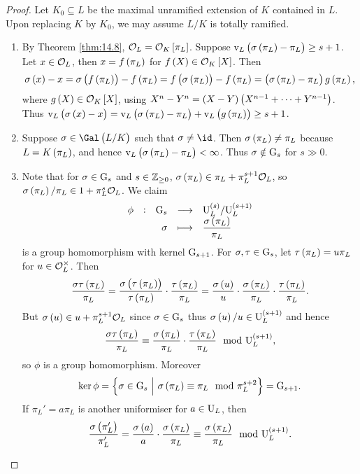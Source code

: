 \begin{proof}
Let $ K_0 \subseteq L $ be the maximal unramified extension of $ K $ contained in $ L $. Upon replacing $ K $ by $ K_0 $, we may assume $ L / K $ is totally ramified.
\begin{enumerate}
\item By Theorem \ref{thm:14.8}, $ \OOO_L = \OOO_K\sbr{\pi_L} $. Suppose $ \v_L\br{\sigma\br{\pi_L} - \pi_L} \ge s + 1 $. Let $ x \in \mathcal{O}_L $, then $ x = f\br{\pi_L} $ for $ f\br{X} \in \OOO_K\sbr{X} $. Then
$$ \sigma\br{x} - x = \sigma\br{f\br{\pi_L}} - f\br{\pi_L} = f\br{\sigma\br{\pi_L}} - f\br{\pi_L} = \br{\sigma\br{\pi_L} - \pi_L}g\br{\pi_L}, $$
where $ g\br{X} \in \OOO_K\sbr{X} $, using $ X^n - Y^n = \br{X - Y}\br{X^{n - 1} + \dots + Y^{n - 1}} $. Thus $ \v_L\br{\sigma\br{x} - x} = \v_L\br{\sigma\br{\pi_L} - \pi_L} + \v_L\br{g\br{\pi_L}} \ge s + 1 $.
\item Suppose $ \sigma \in \Gal\br{L / K} $ such that $ \sigma \ne \id $. Then $ \sigma\br{\pi_L} \ne \pi_L $ because $ L = K\br{\pi_L} $, and hence $ \v_L\br{\sigma\br{\pi_L} - \pi_L} < \infty $. Thus $ \sigma \notin \mathrm{G}_s $ for $ s \gg 0 $.

\pagebreak

\item Note that for $ \sigma \in \mathrm{G}_s $ and $ s \in \mathbb{Z}_{\ge 0} $, $ \sigma\br{\pi_L} \in \pi_L + \pi_L^{s + 1}\OOO_L $, so $ \sigma\br{\pi_L} / \pi_L \in 1 + \pi_L^s\OOO_L $. We claim
$$ \function[\phi]{\G_s}{\U_L^{\br{s}} / \U_L^{\br{s + 1}}}{\sigma}{\dfrac{\sigma\br{\pi_L}}{\pi_L}} $$
is a group homomorphism with kernel $ \mathrm{G}_{s + 1} $. For $ \sigma, \tau \in \mathrm{G}_s $, let $ \tau\br{\pi_L} = u\pi_L $ for $ u \in \mathcal{O}_L^\times $. Then
$$ \dfrac{\sigma\tau\br{\pi_L}}{\pi_L} = \dfrac{\sigma\br{\tau\br{\pi_L}}}{\tau\br{\pi_L}} \cdot \dfrac{\tau\br{\pi_L}}{\pi_L} = \dfrac{\sigma\br{u}}{u} \cdot \dfrac{\sigma\br{\pi_L}}{\pi_L} \cdot \dfrac{\tau\br{\pi_L}}{\pi_L}. $$
But $ \sigma\br{u} \in u + \pi_L^{s + 1}\OOO_L $ since $ \sigma \in \mathrm{G}_s $ thus $ \sigma\br{u} / u \in \U_L^{\br{s + 1}} $ and hence
$$ \dfrac{\sigma\tau\br{\pi_L}}{\pi_L} \equiv \dfrac{\sigma\br{\pi_L}}{\pi_L} \cdot \dfrac{\tau\br{\pi_L}}{\pi_L} \mod \U_L^{\br{s + 1}}, $$
so $ \phi $ is a group homomorphism. Moreover
$$ \ker \phi = \cbr{\sigma \in \G_s \st \sigma\br{\pi_L} \equiv \pi_L \mod \pi_L^{s + 2}} = \G_{s + 1}. $$
If $ \pi_L' = a\pi_L $ is another uniformiser for $ a \in \mathrm{U}_L $, then
$$ \dfrac{\sigma\br{\pi_L'}}{\pi_L'} = \dfrac{\sigma\br{a}}{a} \cdot \dfrac{\sigma\br{\pi_L}}{\pi_L} \equiv \dfrac{\sigma\br{\pi_L}}{\pi_L} \mod \U_L^{\br{s + 1}}. $$
\end{enumerate}
\end{proof}

